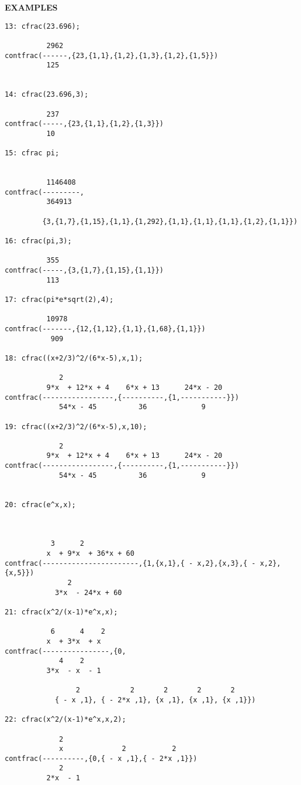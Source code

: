 \large{\textbf{EXAMPLES}}\\[\baselineskip]
\begin{verbatim}
13: cfrac(23.696);

          2962
contfrac(------,{23,{1,1},{1,2},{1,3},{1,2},{1,5}})
          125


14: cfrac(23.696,3);

          237
contfrac(-----,{23,{1,1},{1,2},{1,3}})
          10

15: cfrac pi;


          1146408
contfrac(---------,
          364913

         {3,{1,7},{1,15},{1,1},{1,292},{1,1},{1,1},{1,1},{1,2},{1,1}})

16: cfrac(pi,3);

          355
contfrac(-----,{3,{1,7},{1,15},{1,1}})
          113

17: cfrac(pi*e*sqrt(2),4);

          10978
contfrac(-------,{12,{1,12},{1,1},{1,68},{1,1}})
           909

18: cfrac((x+2/3)^2/(6*x-5),x,1);

             2
          9*x  + 12*x + 4    6*x + 13      24*x - 20
contfrac(-----------------,{----------,{1,-----------}})
             54*x - 45          36             9

19: cfrac((x+2/3)^2/(6*x-5),x,10);

             2
          9*x  + 12*x + 4    6*x + 13      24*x - 20
contfrac(-----------------,{----------,{1,-----------}})
             54*x - 45          36             9


20: cfrac(e^x,x);



           3      2
          x  + 9*x  + 36*x + 60
contfrac(-----------------------,{1,{x,1},{ - x,2},{x,3},{ - x,2},{x,5}})
               2
            3*x  - 24*x + 60

21: cfrac(x^2/(x-1)*e^x,x);

           6      4    2
          x  + 3*x  + x
contfrac(----------------,{0,
             4    2
          3*x  - x  - 1

                 2            2       2       2       2
            { - x ,1}, { - 2*x ,1}, {x ,1}, {x ,1}, {x ,1}})

22: cfrac(x^2/(x-1)*e^x,x,2);

             2
             x              2           2
contfrac(----------,{0,{ - x ,1},{ - 2*x ,1}})
             2
          2*x  - 1

\end{verbatim}

